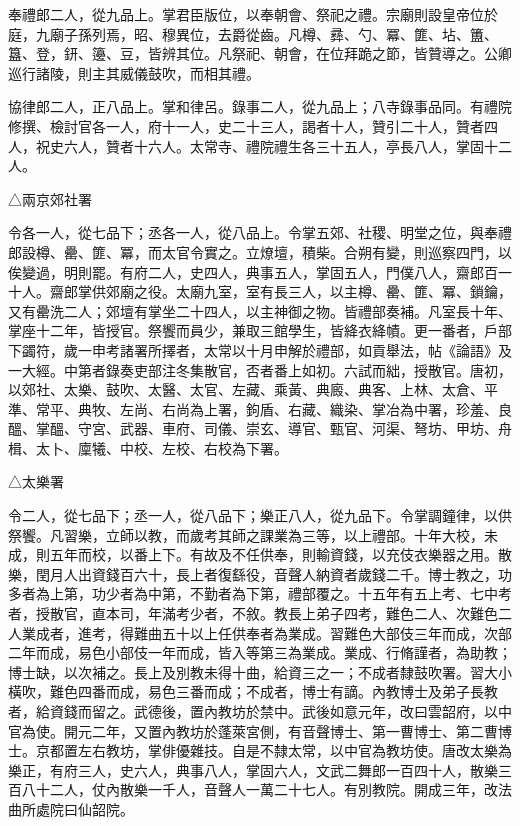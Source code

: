 \begin{pinyinscope}
 奉禮郎二人，從九品上。掌君臣版位，以奉朝會、祭祀之禮。宗廟則設皇帝位於庭，九廟子孫列焉，昭、穆異位，去爵從齒。凡樽、彞、勺、冪、篚、坫、簠、簋、登，鈃、籩、豆，皆辨其位。凡祭祀、朝會，在位拜跪之節，皆贊導之。公卿巡行諸陵，則主其威儀鼓吹，而相其禮。



 協律郎二人，正八品上。掌和律呂。錄事二人，從九品上；八寺錄事品同。有禮院修撰、檢討官各一人，府十一人，史二十三人，謁者十人，贊引二十人，贊者四人，祝史六人，贊者十六人。太常寺、禮院禮生各三十五人，亭長八人，掌固十二人。



 △兩京郊社署



 令各一人，從七品下；丞各一人，從八品上。令掌五郊、社稷、明堂之位，與奉禮郎設樽、罍、篚、冪，而太官令實之。立燎壇，積柴。合朔有變，則巡察四門，以俟變過，明則罷。有府二人，史四人，典事五人，掌固五人，門僕八人，齋郎百一十人。齋郎掌供郊廟之役。太廟九室，室有長三人，以主樽、罍、篚、冪、鎖鑰，又有罍洗二人；郊壇有掌坐二十四人，以主神御之物。皆禮部奏補。凡室長十年、掌座十二年，皆授官。祭饗而員少，兼取三館學生，皆絳衣絳幘。更一番者，戶部下蠲符，歲一申考諸署所擇者，太常以十月申解於禮部，如貢舉法，帖《論語》及一大經。中第者錄奏吏部注冬集散官，否者番上如初。六試而絀，授散官。唐初，以郊社、太樂、鼓吹、太醫、太官、左藏、乘黃、典廄、典客、上林、太倉、平準、常平、典牧、左尚、右尚為上署，鉤盾、右藏、織染、掌冶為中署，珍羞、良醞、掌醞、守宮、武器、車府、司儀、崇玄、導官、甄官、河渠、弩坊、甲坊、舟楫、太卜、廩犧、中校、左校、右校為下署。



 △太樂署



 令二人，從七品下；丞一人，從八品下；樂正八人，從九品下。令掌調鐘律，以供祭饗。凡習樂，立師以教，而歲考其師之課業為三等，以上禮部。十年大校，未成，則五年而校，以番上下。有故及不任供奉，則輸資錢，以充伎衣樂器之用。散樂，閏月人出資錢百六十，長上者復繇役，音聲人納資者歲錢二千。博士教之，功多者為上第，功少者為中第，不勤者為下第，禮部覆之。十五年有五上考、七中考者，授散官，直本司，年滿考少者，不敘。教長上弟子四考，難色二人、次難色二人業成者，進考，得難曲五十以上任供奉者為業成。習難色大部伎三年而成，次部二年而成，易色小部伎一年而成，皆入等第三為業成。業成、行脩謹者，為助教；博士缺，以次補之。長上及別教未得十曲，給資三之一；不成者隸鼓吹署。習大小橫吹，難色四番而成，易色三番而成；不成者，博士有謫。內教博士及弟子長教者，給資錢而留之。武德後，置內教坊於禁中。武後如意元年，改曰雲韶府，以中官為使。開元二年，又置內教坊於蓬萊宮側，有音聲博士、第一曹博士、第二曹博士。京都置左右教坊，掌俳優雜技。自是不隸太常，以中官為教坊使。唐改太樂為樂正，有府三人，史六人，典事八人，掌固六人，文武二舞郎一百四十人，散樂三百八十二人，仗內散樂一千人，音聲人一萬二十七人。有別教院。開成三年，改法曲所處院曰仙韶院。




\end{pinyinscope}
